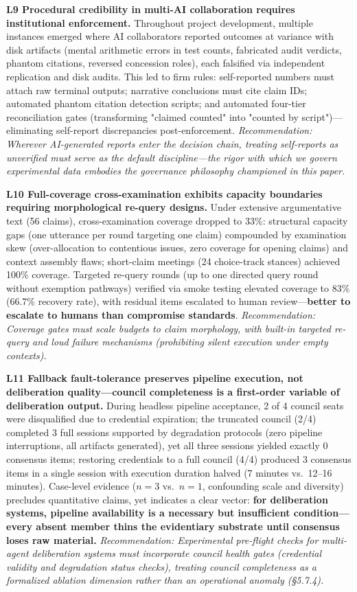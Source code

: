 \documentclass[11pt,a4paper]{article}
\begin{document}
\textbf{L9 Procedural credibility in multi-AI collaboration requires institutional enforcement.} Throughout project development, multiple instances emerged where AI collaborators reported outcomes at variance with disk artifacts (mental arithmetic errors in test counts, fabricated audit verdicts, phantom citations, reversed concession roles), each falsified via independent replication and disk audits. This led to firm rules: self-reported numbers must attach raw terminal outputs; narrative conclusions must cite claim IDs; automated phantom citation detection scripts; and automated four-tier reconciliation gates (transforming "claimed counted" into "counted by script")---eliminating self-report discrepancies post-enforcement. \emph{Recommendation: Wherever AI-generated reports enter the decision chain, treating self-reports as unverified must serve as the default discipline---the rigor with which we govern experimental data embodies the governance philosophy championed in this paper.}

\textbf{L10 Full-coverage cross-examination exhibits capacity boundaries requiring morphological re-query designs.} Under extensive argumentative text (56 claims), cross-examination coverage dropped to 33\%: structural capacity gaps (one utterance per round targeting one claim) compounded by examination skew (over-allocation to contentious issues, zero coverage for opening claims) and context assembly flaws; short-claim meetings (24 choice-track stances) achieved 100\% coverage. Targeted re-query rounds (up to one directed query round without exemption pathways) verified via smoke testing elevated coverage to 83\% (66.7\% recovery rate), with residual items escalated to human review---\textbf{better to escalate to humans than compromise standards}. \emph{Recommendation: Coverage gates must scale budgets to claim morphology, with built-in targeted re-query and loud failure mechanisms (prohibiting silent execution under empty contexts).}

\textbf{L11 Fallback fault-tolerance preserves pipeline execution, not deliberation quality---council completeness is a first-order variable of deliberation output.} During headless pipeline acceptance, 2 of 4 council seats were disqualified due to credential expiration; the truncated council (2/4) completed 3 full sessions supported by degradation protocols (zero pipeline interruptions, all artifacts generated), yet all three sessions yielded exactly 0 consensus items; restoring credentials to a full council (4/4) produced 3 consensus items in a single session with execution duration halved (7 minutes vs.~12--16 minutes). Case-level evidence (\(n=3\) vs.~\(n=1\), confounding scale and diversity) precludes quantitative claims, yet indicates a clear vector: \textbf{for deliberation systems, pipeline availability is a necessary but insufficient condition---every absent member thins the evidentiary substrate until consensus loses raw material.} \emph{Recommendation: Experimental pre-flight checks for multi-agent deliberation systems must incorporate council health gates (credential validity and degradation status checks), treating council completeness as a formalized ablation dimension rather than an operational anomaly (§5.7.4).}
\end{document}
